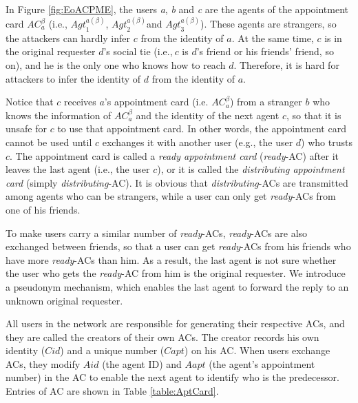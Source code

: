 In Figure \ref{fig:EoACPME}, the users \textit{a}, \textit{b} and \textit{c} are the agents of the appointment card ${AC}^{\beta }_a$ (i.e., ${Agt}^{a\left(\beta \right)}_1$, ${Agt}^{a\left(\beta \right)}_2$and ${Agt}^{a\left(\beta \right)}_3$). These agents are strangers, so the attackers can hardly infer $c$ from the identity of $a$. At the same time, $c$ is in the original requester $d$'s social tie (i.e.,$\ c$ is $d$'s friend or his friends' friend, so on), and he is the only one who knows how to reach $d$. Therefore, it is hard for attackers to infer the identity of $d$ from the identity of $a$.

Notice that $c$ receives $a$'s appointment card (i.e. ${AC}^{\beta }_a$) from a stranger $b$ who knows the information of ${AC}^{\beta }_a$ and the identity of the next agent $c$, so that it is unsafe for $c$ to use that appointment card. In other words, the appointment card cannot be used until $c$ exchanges it with another user (e.g., the user $d$) who trusts $c$. The appointment card is called a \textit{ready appointment card} (\textit{ready}-AC) after it leaves the last agent (i.e., the user $c$), or it is called the \textit{distributing appointment card} (simply \textit{distributing}-AC). It is obvious that \textit{distributing}-ACs are transmitted among agents who can be strangers, while a user can only get \textit{ready}-ACs from  one of his friends.

To make users carry a similar number of \textit{ready}-ACs, \textit{ready}-ACs are also exchanged between friends, so that a user can get \textit{ready}-ACs from his friends who have more \textit{ready}-ACs than him. As a result, the last agent is not sure whether the user who gets the \textit{ready}-AC from him is the original requester. We introduce a pseudonym mechanism, which enables the last agent to forward the reply to an unknown original requester. 

All users in the network are responsible for generating their respective ACs, and they are called the creators of their own ACs. The creator records his own identity ($Cid$) and a unique number ($Capt$) on his AC. When users exchange ACs, they modify $Aid$ (the agent ID) and ${Aapt}$ (the agent's appointment number) in the AC to enable the next agent to identify who is the predecessor. Entries of AC are shown in Table \ref{table:AptCard}.


